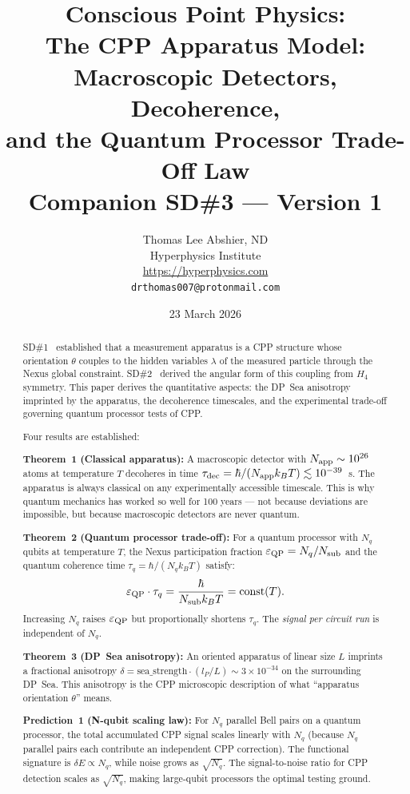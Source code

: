 \documentclass[11pt,a4paper]{article}
\title{\textbf{Conscious Point Physics:\\
The CPP Apparatus Model:\\
Macroscopic Detectors, Decoherence,\\
and the Quantum Processor Trade-Off Law}\\[6pt]
{\large Companion SD\#3 --- Version 1}}
\author{Thomas Lee Abshier, ND\\
Hyperphysics Institute\\
\url{https://hyperphysics.com}\\
\texttt{drthomas007@protonmail.com}}
\date{23 March 2026}
\newcommand{\lP}{l_P}
\newcommand{\eps}{\varepsilon}
\begin{document}
\maketitle

\begin{abstract}
SD\#1~\citep{cpp_sd1} established that a measurement apparatus is a
CPP structure whose orientation $\theta$ couples to the hidden
variables $\lambda$ of the measured particle through the Nexus global
constraint.  SD\#2~\citep{cpp_sd2} derived the angular form of this
coupling from $H_4$ symmetry.  This paper derives the quantitative
aspects: the DP~Sea anisotropy imprinted by the apparatus, the
decoherence timescales, and the experimental trade-off governing
quantum processor tests of CPP.

Four results are established:

\textbf{Theorem~1 (Classical apparatus):}
A macroscopic detector with $N_{\rm app} \sim 10^{26}$ atoms at
temperature $T$ decoheres in time $\tau_{\rm dec} = \hbar /
(N_{\rm app} k_B T) \lesssim 10^{-39}$~s.  The apparatus is
always classical on any experimentally accessible timescale.
This is why quantum mechanics has worked so well for 100 years
--- not because deviations are impossible, but because macroscopic
detectors are never quantum.

\textbf{Theorem~2 (Quantum processor trade-off):}
For a quantum processor with $N_q$ qubits at temperature $T$,
the Nexus participation fraction $\eps_{\rm QP} = N_q / N_{\rm sub}$
and the quantum coherence time $\tau_q = \hbar/(N_q k_B T)$
satisfy:
\begin{equation*}
\eps_{\rm QP} \cdot \tau_q
= \frac{\hbar}{N_{\rm sub} k_B T} = \text{const}(T).
\end{equation*}
Increasing $N_q$ raises $\eps_{\rm QP}$ but proportionally shortens
$\tau_q$.  The \emph{signal per circuit run} is independent of $N_q$.

\textbf{Theorem~3 (DP~Sea anisotropy):}
An oriented apparatus of linear size $L$ imprints a fractional
anisotropy $\delta = \text{sea\_strength} \cdot (\lP/L) \sim 3
\times 10^{-34}$ on the surrounding DP~Sea.  This anisotropy is
the CPP microscopic description of what ``apparatus orientation
$\theta$'' means.

\textbf{Prediction~1 (N-qubit scaling law):}
For $N_q$ parallel Bell pairs on a quantum processor, the total
accumulated CPP signal scales linearly with $N_q$ (because $N_q$
parallel pairs each contribute an independent CPP correction).
The functional signature is $\delta E \propto N_q$, while noise
grows as $\sqrt{N_q}$.  The signal-to-noise ratio for CPP detection
scales as $\sqrt{N_q}$, making large-qubit processors the
optimal testing ground.
\end{abstract}
\end{document}
